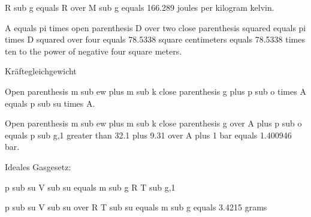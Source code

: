 R sub g equals R over M sub g equals 166.289 joules per kilogram kelvin.

A equals pi times open parenthesis D over two close parenthesis squared equals pi times D squared over four equals 78.5338 square centimeters equals 78.5338 times ten to the power of negative four square meters.

Kräftegleichgewicht

Open parenthesis m sub ew plus m sub k close parenthesis g plus p sub o times A equals p sub su times A.

Open parenthesis m sub ew plus m sub k close parenthesis g over A plus p sub o equals p sub g,1 greater than 32.1 plus 9.31 over A plus 1 bar equals 1.400946 bar.

Ideales Gasgesetz:

p sub su V sub su equals m sub g R T sub g,1

p sub su V sub su over R T sub su equals m sub g equals 3.4215 grams